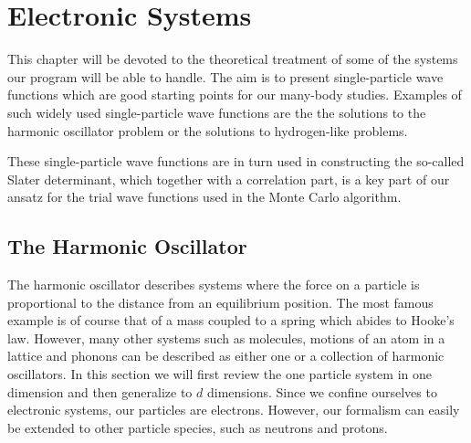 \chapter{Electronic Systems}
\label{ch:electronic_systems}
This chapter will be devoted to the theoretical treatment of some of the systems our program will be able to handle. The aim is to present single-particle wave functions which are good starting points 
for our many-body studies. Examples of such widely used 
single-particle wave functions are the the solutions 
to the harmonic oscillator problem or the solutions to hydrogen-like problems.

These single-particle wave functions are in turn used in constructing the so-called Slater determinant,
which together with a correlation part, is a key part of our ansatz for the trial wave functions
used in the Monte Carlo algorithm. 
\section{The Harmonic Oscillator}
The harmonic oscillator describes systems where the force 
on a particle is proportional to the distance from an equilibrium position. 
The most famous example is of course that of a mass coupled to a spring which abides to Hooke's law. However, many other systems such as molecules, motions of an atom in a lattice and phonons can be described as either one or a collection of harmonic oscillators. In this section we will first review the one particle system in one dimension and then generalize to $d$ dimensions. 
Since we confine ourselves to electronic systems, our particles are electrons. However, our formalism
can easily be extended to other particle species, such as neutrons and protons.

